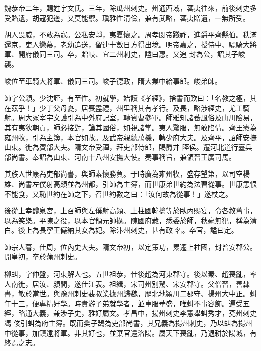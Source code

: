 \begin{pinyinscope}
 魏恭帝二年，賜姓宇文氏。三年，除瓜州刺史。州通西域，蕃夷往來，前後刺史多受賂遺，胡寇犯邊，又莫能禦。瑱雅性清儉，兼有武略，蕃夷贈遺，一無所受。



 胡人畏威，不敢為寇。公私安靜，夷夏懷之。周孝閔帝踐祚，進爵平齊縣伯。秩滿還京，吏人戀慕，老幼追送，留連十數日方得出境。明帝嘉之，授侍中、驃騎大將軍、開府儀同三司。卒，贈岐、宜二州刺史，謚曰惠。又追
 封為公，詔其子峻襲。



 峻位至車騎大將軍、儀同三司。峻子德政，隋大業中給事郎。峻弟師。



 師字公穎。少沈謹，有至性。初就學，始讀《孝經》，捨書而歎曰：「名教之極，其在茲乎！」少丁父母憂，居喪盡禮，州里稱其有孝行。及長，略涉經史，尤工騎射。周大冢宰宇文護引為中外府記室，轉賓曹參軍。師雅知諸蕃風俗及山川險易，其有夷狄朝貢，師必接對，論其國俗，如視諸掌。夷人驚服，無敢陷情。齊王憲為雍州牧，引為主簿，本官如故。及武帝親總萬機，轉少府大夫。及齊平，詔師安撫山東。徙為賓部大夫。隋文帝受禪，拜吏部侍郎，賜爵井
 陘侯。遷河北道行臺兵部尚書。奉詔為山東、河南十八州安撫大使。奏事稱旨，兼領晉王廣司馬。



 其族人世康為吏部尚書，與師素懷勝負。于時廣為雍州牧，盛存望第，以司空楊雄、尚書左僕射高熲並為州都，引師為主簿，而世康弟世約為法曹從事。世康恚恨不能食，又恥世約在師之下，召世約數之曰：「汝何故為從事！」遂杖之。



 後從上幸醴泉宮，上召師與左僕射高熲、上柱國韓擒等於臥內賜宴，令各敘舊事，以為笑樂。平陳之役，以本官領元帥掾。陳國府藏，悉委於師，秋毫無犯，稱為清白。後上為長寧王儼納其女為妃。除汴州刺史，甚有政
 名。卒官，謚曰定。



 師宗人暮，仕周，位內史大夫。隋文帝初，以定策功，累遷上柱國，封普安郡公。開皇初，卒於蒲州刺史。



 柳虯，字仲盤，河東解人也。五世祖恭，仕後趙為河東郡守。後以秦、趙喪亂，率人南徙，居汝、潁間，遂仕江表。祖緝，宋司州別駕、宋安郡守。父僧習，善隸書，敏於當世。與豫州刺史裴叔業據州歸魏，歷北地潁川二郡守、揚州大中正。虯年十三，便專精好學。時貴游子弟就學者，並車服華盛，唯虯不事容飾。遍受五經，略通大義，兼涉子史，雅好屬文。孝昌中，揚州刺史李憲舉虯秀才，兗州刺史馮
 俊引虯為府主簿。既而樊子鵠為吏部尚書，其兄義為揚州刺史，乃以虯為揚州中從事，加鎮遠將軍。非其好也，並棄官還洛陽。屬天下喪亂，乃退耕於陽城，有終焉之志。




\end{pinyinscope}
